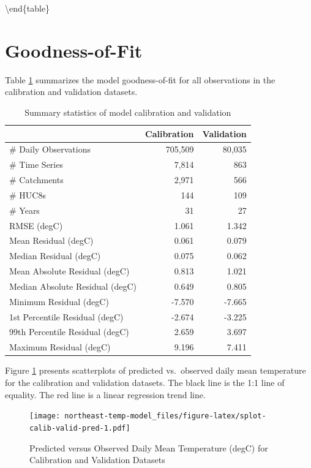 \documentclass[
]{book}
\begin{document}
\textbackslash end\{table\}

\section{Goodness-of-Fit}\label{goodness-of-fit}

Table \ref{tab:table-gof} summarizes the model goodness-of-fit for all observations in the calibration and validation datasets.

\begin{table}

\caption{\label{tab:table-gof}Summary statistics of model calibration and validation}
\centering
\begin{tabular}[t]{l|r|r}
\hline
 & Calibration & Validation\\
\hline
\# Daily Observations & 705,509 & 80,035\\
\hline
\# Time Series & 7,814 & 863\\
\hline
\# Catchments & 2,971 & 566\\
\hline
\# HUC8s & 144 & 109\\
\hline
\# Years & 31 & 27\\
\hline
RMSE (degC) & 1.061 & 1.342\\
\hline
Mean Residual (degC) & 0.061 & 0.079\\
\hline
Median Residual (degC) & 0.075 & 0.062\\
\hline
Mean Absolute Residual (degC) & 0.813 & 1.021\\
\hline
Median Absolute Residual (degC) & 0.649 & 0.805\\
\hline
Minimum Residual (degC) & -7.570 & -7.665\\
\hline
1st Percentile Residual (degC) & -2.674 & -3.225\\
\hline
99th Percentile Residual (degC) & 2.659 & 3.697\\
\hline
Maximum Residual (degC) & 9.196 & 7.411\\
\hline
\end{tabular}
\end{table}

Figure \ref{fig:splot-calib-valid-pred} presents scatterplots of predicted vs.~observed daily mean temperature for the calibration and validation datasets. The black line is the 1:1 line of equality. The red line is a linear regression trend line.

\begin{figure}
\centering
\texttt{[image: northeast-temp-model\_files/figure-latex/splot-calib-valid-pred-1.pdf]}
\caption{\label{fig:splot-calib-valid-pred}Predicted versus Observed Daily Mean Temperature (degC) for Calibration and Validation Datasets}
\end{figure}
\end{document}
